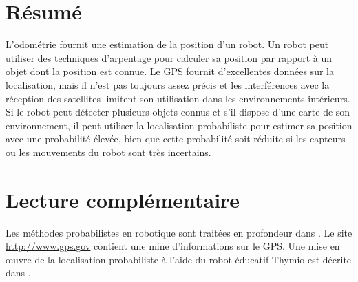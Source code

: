 \section{Résumé}

L'odométrie fournit une estimation de la position d'un robot. Un robot peut utiliser des techniques d'arpentage pour calculer sa position par rapport à un objet dont la position est connue. Le GPS fournit d'excellentes données sur la localisation, mais il n'est pas toujours assez précis et les interférences avec la réception des satellites limitent son utilisation dans les environnements intérieurs. Si le robot peut détecter plusieurs objets connus et s'il dispose d'une carte de son environnement, il peut utiliser la localisation probabiliste pour estimer sa position avec une probabilité élevée, bien que cette probabilité soit réduite si les capteurs ou les mouvements du robot sont très incertains.

\section{Lecture complémentaire}

Les méthodes probabilistes en robotique sont traitées en profondeur dans \cite{thrun}. Le site \url{http://www.gps.gov} contient une mine d'informations sur le GPS. Une mise en œuvre de la localisation probabiliste à l'aide du robot éducatif Thymio est décrite dans \cite{wang2016dars}.
